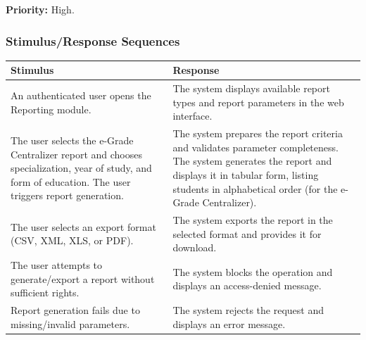 \documentclass[11pt, a4paper]{article}
\begin{document}
\textbf{Priority:} High.

\subsubsection{Stimulus/Response Sequences}
\begin{table}[H]
\begin{tabularx}{\textwidth}{>{\raggedright\arraybackslash}p{3.2cm} >{\raggedright\arraybackslash}X}
\toprule
\textbf{Stimulus} & \textbf{Response} \\
\midrule
An authenticated user opens the Reporting module. & The system displays available report types and report parameters in the web interface. \\
\midrule
The user selects the e-Grade Centralizer report and chooses specialization, year of study, and form of education. The user triggers report generation. & The system prepares the report criteria and validates parameter completeness. The system generates the report and displays it in tabular form, listing students in alphabetical order (for the e-Grade Centralizer). \\
\midrule
The user selects an export format (CSV, XML, XLS, or PDF). & The system exports the report in the selected format and provides it for download. \\
\midrule
The user attempts to generate/export a report without sufficient rights. & The system blocks the operation and displays an access-denied message. \\
\midrule
Report generation fails due to missing/invalid parameters. & The system rejects the request and displays an error message. \\
\bottomrule
\end{tabularx}
\end{table}
\end{document}
